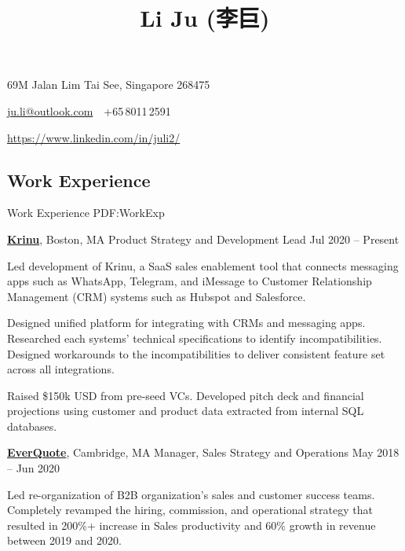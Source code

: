 \documentclass[letterpaper,10pt,oneside]{article}
\newcommand{\CVAuthor}{Li Ju (李巨)}
\begin{document}

\title{\CVAuthor}

\begin{subtitle}
69M Jalan Lim Tai See, Singapore 268475
\par
\href{mailto:ju.li@outlook.com}
{ju.li@outlook.com}
\,\SubBulletSymbol\,
+65\,8011\,2591
\par 
\href{https://www.linkedin.com/in/juli2/}{https://www.linkedin.com/in/juli2/}
\end{subtitle}

\begin{body}


\section
{Work\newline
Experience}
{Work Experience}
{PDF:WorkExp}

\href{https://krinu.com/}
{\textbf{Krinu}},
Boston, MA
\GapNoBreak
Product Strategy and Development Lead
\hfill
Jul 2020 -- Present
\begin{flushleft}

\BulletItem Led development of Krinu, a SaaS sales enablement tool that connects messaging apps such as WhatsApp, Telegram, and iMessage to Customer Relationship Management (CRM) systems such as Hubspot and Salesforce. 

\vspace{0.3em} \SubBulletItem Designed unified platform for integrating with CRMs and messaging apps. Researched each systems' technical specifications to identify incompatibilities. Designed workarounds to the incompatibilities to deliver consistent feature set across all integrations. 

\vspace{0.75em}
\BulletItem Raised \$150k USD from pre-seed VCs. Developed pitch deck and financial projections using customer and product data extracted from internal SQL databases. 

\end{flushleft}


\href{http://www.everquote.com/}
{\textbf{EverQuote}},
Cambridge, MA
\GapNoBreak
Manager, Sales Strategy and Operations
\hfill
May 2018 -- Jun 2020
\begin{flushleft}


\BulletItem Led re-organization of B2B organization's sales and customer success teams. Completely revamped the hiring, commission, and operational strategy that resulted in 200\%+ increase in Sales productivity and 60\% growth in revenue between 2019 and 2020.


\end{flushleft}
\end{body}
\end{document}
